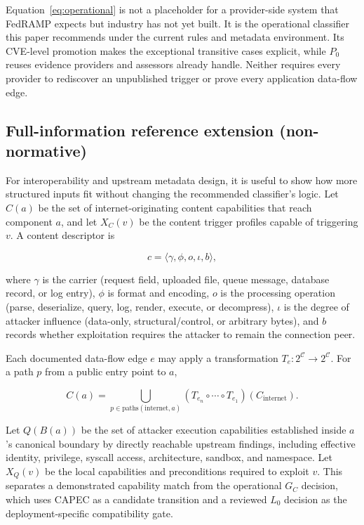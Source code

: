 \documentclass[11pt]{article}
\begin{document}
Equation~\ref{eq:operational} is not a placeholder for a provider-side system
that FedRAMP expects but industry has not yet built. It is the operational
classifier this paper recommends under the current rules and metadata
environment. Its CVE-level promotion makes the exceptional transitive cases
explicit, while $P_0$ reuses evidence providers and assessors already handle.
Neither requires every provider to rediscover an unpublished trigger or prove
every application data-flow edge.

\subsection{Full-information reference extension (non-normative)}
For interoperability and upstream metadata design, it is useful to show
how more structured inputs fit without changing the recommended classifier's
logic. Let $C(a)$ be the set of internet-originating content capabilities that
reach component $a$, and let $X_C(v)$ be the content trigger profiles capable
of triggering $v$. A content descriptor is

\[
c=\langle\gamma,\phi,o,\iota,b\rangle,
\]

where $\gamma$ is the carrier (request field, uploaded file, queue message,
database record, or log entry), $\phi$ is format and encoding, $o$ is the
processing operation (parse, deserialize, query, log, render, execute, or
decompress), $\iota$ is the degree of attacker influence (data-only,
structural/control, or arbitrary bytes), and $b$ records whether exploitation
requires the attacker to remain the connection peer.

Each documented data-flow edge $e$ may apply a transformation
$T_e:2^{\mathcal C}\to2^{\mathcal C}$. For a path $p$ from a public entry point
to $a$,

\begin{equation}
C(a)=\bigcup_{p\in\mathrm{paths}(\mathrm{internet},a)}
\left(T_{e_n}\circ\cdots\circ T_{e_1}\right)(C_{\mathrm{internet}}).
\label{eq:content-surface}
\end{equation}

Let $Q(B(a))$ be the set of attacker execution capabilities established inside
$a$'s canonical boundary by directly reachable upstream findings, including
effective identity, privilege, syscall access, architecture, sandbox, and
namespace. Let $X_Q(v)$ be the local capabilities and preconditions required
to exploit $v$. This separates a demonstrated capability match from the
operational $G_C$ decision, which uses CAPEC as a candidate transition and a
reviewed $L_0$ decision as the deployment-specific compatibility gate.
\end{document}
